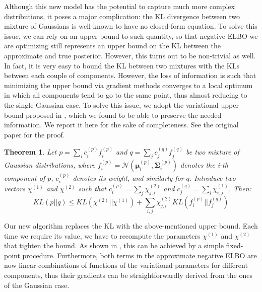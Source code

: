 \documentclass{article}
\newtheorem{theorem}{Theorem}
\begin{document}
Although this new model has the potential to capture much more complex distributions, it poses a major complication: the KL divergence between two mixture of Gaussians is well-known to have no closed-form equation. To solve this issue, we can rely on an upper bound to such quantity, so that negative ELBO we are optimizing still represents an upper bound on the KL between the approximate and true posterior. However, this turns out to be non-trivial as well. In fact, it is very easy to bound the KL between two mixtures with the KLs between each couple of components. However, the loss of information is such that minimizing the upper bound via gradient methods converges to a local optimum in which all components tend to go to the same point, thus almost reducing to the single Gaussian case. To solve this issue, we adopt the variational upper bound proposed in \cite{}, which we found to be able to preserve the needed information. We report it here for the sake of completeness. See the original paper for the proof.
\begin{theorem}
Let $p = \sum_{i} c_i^{(p)} f_i^{(p)}$ and $q = \sum_{j} c_j^{(q)} f_j^{(q)}$ be two mixture of Gaussian distributions, where $f_i^{(p)} = \mathcal{N}(\bm{\mu}_i^{(p)},\bm{\Sigma}_i^{(p)})$ denotes the i-th component of $p$, $c_i^{(p)}$ denotes its weight, and similarly for $q$. Introduce two vectors $\chi^{(1)}$ and $\chi^{(2)}$ such that $c_i^{(p)} = \sum_j \chi^{(2)}_{j,i}$ and $c_j^{(q)} = \sum_i \chi^{(1)}_{i,j}$. Then:
\begin{equation}
KL(p||q) \leq KL(\chi^{(2)}||\chi^{(1)}) + \sum_{i,j} \chi^{(2)}_{j,i}KL(f_i^{(p)}||f_j^{(q)})
\end{equation}
\end{theorem}
Our new algorithm replaces the KL with the above-mentioned upper bound. Each time we require its value, we have to recompute the parameters $\chi^{(1)}$ and $\chi^{(2)}$ that tighten the bound. As shown in \cite{}, this can be achieved by a simple fixed-point procedure. Furthermore, both terms in the approximate negative ELBO are now linear combinations of functions of the variational parameters for different components, thus their gradients can be straightforwardly derived from the ones of the Gaussian case.
\end{document}
